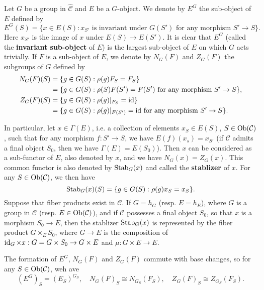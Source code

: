 \begin{definition}
Let $G$ be a group in $\widehat{\mathcal{C}}$ and $E$ be a $G$-object. We denote by $E^G$ the sub-object of $E$ defined by
\[E^G(S)=\{x\in E(S):\text{$x_{S'}$ is invariant under $G(S')$ for any morphism $S'\to S$}\}.\]
Here $x_{S'}$ is the image of $x$ under $E(S)\to E(S')$. It is clear that $E^G$ (called the \textbf{invariant sub-object} of $E$) is the largest sub-object of $E$ on which $G$ acts trivially. If $F$ is a sub-object of $E$, we denote by $N_G(F)$ and $Z_G(F)$ the subgroups of $G$ defined by
\begin{align*}
N_G(F)(S)&=\{g\in G(S):\rho(g)F_S=F_S\}\\
&=\{g\in G(S):\text{$\rho(S)F(S')=F(S')$ for any morphism $S'\to S$}\},\\
Z_G(F)(S)&=\{g\in G(S):\rho(g)|_{F_S}=\operatorname{id}\}\\
&=\{g\in G(S):\text{$\rho(g)|_{F(S')}=\operatorname{id}$ for any morphism $S'\to S$}\}.
\end{align*}
\end{definition}
In particular, let $x\in\Gamma(E)$, i.e. a collection of elements $x_S\in E(S)$, $S\in\mathrm{Ob}(\mathcal{C})$, such that for any morphism $f:S'\to S$, we have $E(f)(x_s)=x_{S'}$ (if $\mathcal{C}$ admits a final object $S_0$, then we have $\Gamma(E)=E(S_0)$). Then $x$ can be considered as a sub-functor of $E$, also denoted by $x$, and we have $N_G(x)=Z_G(x)$. This common functor is also denoted by $\mathrm{Stab}_G(x)$ and called the \textbf{stablizer} of $x$. For any $S\in\mathrm{Ob}(\mathcal{C})$, we then have
\[\mathrm{Stab}_G(x)(S)=\{g\in G(S):\rho(g)x_S=x_S\}.\]
Suppose that fiber products exist in $\mathcal{C}$. If $G=h_G$ (resp. $E=h_E$), where $G$ is a group in $\mathcal{C}$ (resp. $E\in\mathrm{Ob}(\mathcal{C})$), and if $\mathcal{C}$ possesses a final object $S_0$, so that $x$ is a morphism $S_0\to E$, then the stablizer $\mathrm{Stab}_G(x)$ is represented by the fiber product $G\times_ES_0$, where $G\to E$ is the composition of $\operatorname{id}_G\times x:G=G\times S_0\to G\times E$ and $\mu:G\times E\to E$.

\begin{remark}
The formation of $E^G$, $N_G(F)$ and $Z_G(F)$ commute with base changes, so for any $S\in\mathrm{Ob}(\mathcal{C})$, weh ave
\[(E^G)_S=(E_S)^{G_S},\quad N_G(F)_S\cong N_{G_S}(F_S),\quad Z_G(F)_S\cong Z_{G_S}(F_S).\]
\end{remark}

